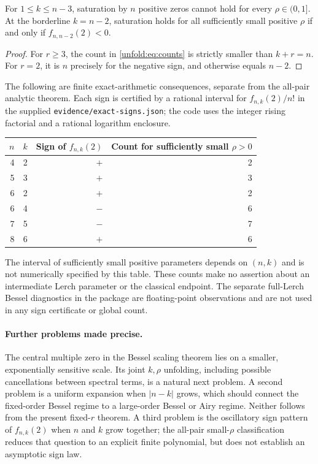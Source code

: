 \begin{corollary}
For $1\leq k\leq n-3$, saturation by $n$ positive zeros cannot hold
for every $\rho\in(0,1]$. At the borderline $k=n-2$, saturation
holds for all sufficiently small positive $\rho$ if and only if
$f_{n,n-2}(2)<0$.
\end{corollary}
\begin{proof}
For $r\geq3$, the count in \eqref{unfold:eq:counts} is strictly
smaller than $k+r=n$. For $r=2$, it is $n$ precisely for the
negative sign, and otherwise equals $n-2$.
\end{proof}

The following are finite exact-arithmetic consequences, separate from
the all-pair analytic theorem. Each sign is certified by a rational
interval for $f_{n,k}(2)/n!$ in the supplied
\texttt{evidence/exact-signs.json}; the code uses the integer rising
factorial and a rational logarithm enclosure.
\begin{center}
\begin{tabular}{rrrr}
\hline
$n$&$k$&Sign of $f_{n,k}(2)$&Count for sufficiently small $\rho>0$\\
\hline
4&2&$+$&2\\
5&3&$+$&3\\
6&2&$+$&2\\
6&4&$-$&6\\
7&5&$-$&7\\
8&6&$+$&6\\
\hline
\end{tabular}
\end{center}
The interval of sufficiently small positive parameters depends on
$(n,k)$ and is not numerically specified by this table. These counts
make no assertion about an intermediate Lerch parameter or the
classical endpoint. The separate full-Lerch Bessel diagnostics in the
package are floating-point observations and are not used in any sign
certificate or global count.

\paragraph{Further problems made precise.}
The central multiple zero in the Bessel scaling theorem lies on a
smaller, exponentially sensitive scale. Its joint $k,\rho$ unfolding,
including possible cancellations between spectral terms, is a natural
next problem. A second problem is a uniform expansion when $|n-k|$
grows, which should connect the fixed-order Bessel regime to a
large-order Bessel or Airy regime. Neither follows from the present
fixed-$r$ theorem. A third problem is the oscillatory sign pattern of
$f_{n,k}(2)$ when $n$ and $k$ grow together; the all-pair small-$\rho$
classification reduces that question to an explicit finite polynomial,
but does not establish an asymptotic sign law.

